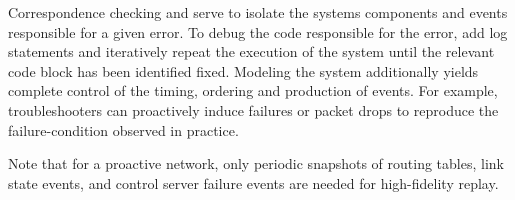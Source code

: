 Correspondence checking and \simulator{} serve to isolate the systems
components and events responsible for a given error. To debug the code
responsible for the error, add log statements and iteratively repeat the
execution of the system until the relevant code block has been identified fixed. Modeling the system additionally
yields complete control of the timing, ordering and production of events.
For example, troubleshooters can proactively induce failures or packet drops
to reproduce the failure-condition observed in practice.

 Note that for a proactive
network, only periodic snapshots of routing tables, link state events, and
control server failure events are needed for high-fidelity replay.


